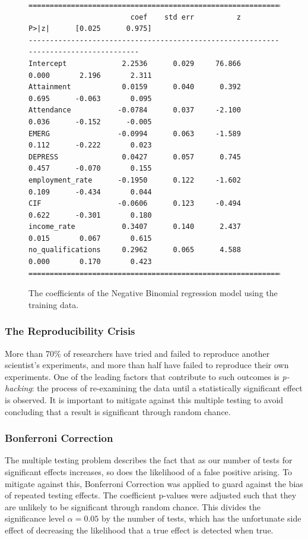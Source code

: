 \documentclass{thesis}
\begin{document}
\begin{figure}[h]
    \centering
\footnotesize
\begin{verbatim}
=====================================================================================
                        coef    std err          z      P>|z|      [0.025      0.975]
-------------------------------------------------------------------------------------
Intercept             2.2536      0.029     76.866      0.000       2.196       2.311
Attainment            0.0159      0.040      0.392      0.695      -0.063       0.095
Attendance           -0.0784      0.037     -2.100      0.036      -0.152      -0.005
EMERG                -0.0994      0.063     -1.589      0.112      -0.222       0.023
DEPRESS               0.0427      0.057      0.745      0.457      -0.070       0.155
employment_rate      -0.1950      0.122     -1.602      0.109      -0.434       0.044
CIF                  -0.0606      0.123     -0.494      0.622      -0.301       0.180
income_rate           0.3407      0.140      2.437      0.015       0.067       0.615
no_qualifications     0.2962      0.065      4.588      0.000       0.170       0.423
=====================================================================================
\end{verbatim}
\normalsize
    \caption{The coefficients of the Negative Binomial regression model using the training data.}
    \label{fig:nb-coeff}
\end{figure}

\subsubsection{The Reproducibility Crisis}

More than 70\% of researchers have tried and failed to reproduce another scientist's experiments, and more than half have failed to reproduce their own experiments\cite{Baker2016}. One of the leading factors that contribute to such outcomes is \textit{p-hacking}: the process of re-examining the data until a statistically significant effect is observed. It is important to mitigate against this multiple testing to avoid concluding that a result is significant through random chance.

\subsubsection{Bonferroni Correction}

The multiple testing problem describes the fact that as our number of tests for significant effects increases, so does the likelihood of a false positive arising. To mitigate against this, Bonferroni Correction was applied to guard against the bias of repeated testing effects. The coefficient p-values were adjusted such that they are unlikely to be significant through random chance. This divides the significance level $\alpha = 0.05$ by the number of tests, which has the unfortunate side effect of decreasing the likelihood that a true effect is detected when true.
\end{document}

